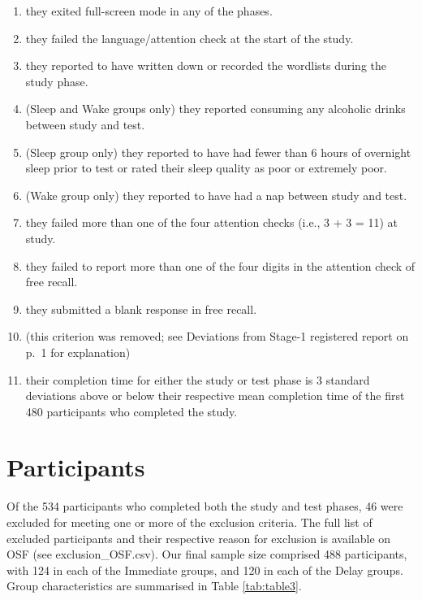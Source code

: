 \documentclass[
]{article}
\begin{document}
\begin{enumerate}
\def\labelenumi{\arabic{enumi}.}
\item
  they exited full-screen mode in any of the phases.
\item
  they failed the language/attention check at the start of the study.
\item
  they reported to have written down or recorded the wordlists during the study phase.
\item
  (Sleep and Wake groups only) they reported consuming any alcoholic drinks between study and test.
\item
  (Sleep group only) they reported to have had fewer than 6 hours of overnight sleep prior to test or rated their sleep quality as poor or extremely poor.
\item
  (Wake group only) they reported to have had a nap between study and test.
\item
  they failed more than one of the four attention checks (i.e., 3 + 3 = 11) at study.
\item
  they failed to report more than one of the four digits in the attention check of free recall.
\item
  they submitted a blank response in free recall.
\item
  (this criterion was removed; see Deviations from Stage-1 registered report on p.~1 for explanation)
\item
  their completion time for either the study or test phase is 3 standard deviations above or below their respective mean completion time of the first 480 participants who completed the study.
\end{enumerate}

\hypertarget{participants}{%
\section{Participants}\label{participants}}

Of the 534 participants who completed both the study and test phases, 46 were excluded for meeting one or more of the exclusion criteria. The full list of excluded participants and their respective reason for exclusion is available on OSF (see exclusion\_OSF.csv). Our final sample size comprised 488 participants, with 124 in each of the Immediate groups, and 120 in each of the Delay groups. Group characteristics are summarised in Table \ref{tab:table3}.
\end{document}

